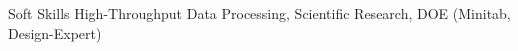 \begin{cvskills}
\vspace{0.05cm}

\cvskill
    {Soft Skills}
    {High-Throughput Data Processing, Scientific Research, DOE (Minitab, Design-Expert)}

\vspace{0.05cm}



    
\end{cvskills}



